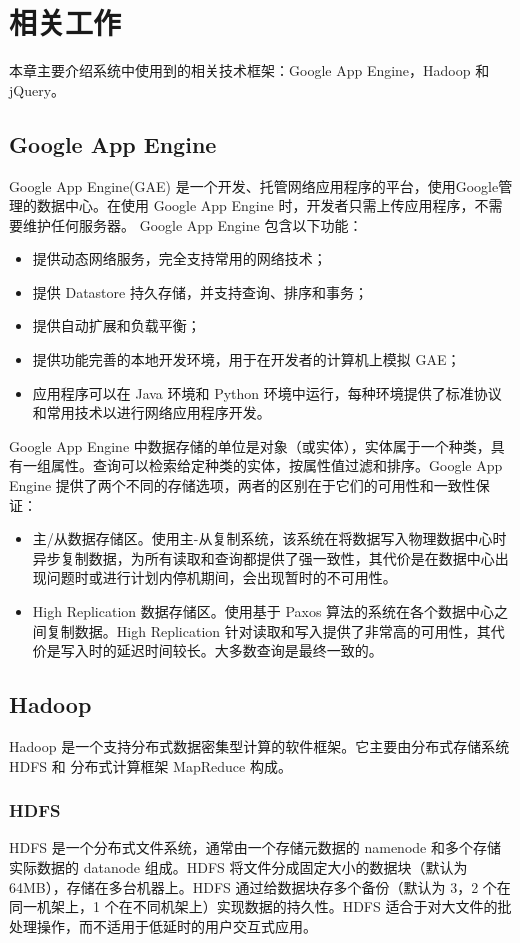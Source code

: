 \chapter{相关工作}
\thispagestyle{fancy}
本章主要介绍系统中使用到的相关技术框架：Google App Engine，Hadoop 和 jQuery。

\section{Google App Engine}
Google App Engine\cite{gae}(GAE) 是一个开发、托管网络应用程序的平台，使用Google管理的数据中心。在使用 Google App Engine 时，开发者只需上传应用程序，不需要维护任何服务器。
Google App Engine 包含以下功能：
\begin{itemize}
\item 提供动态网络服务，完全支持常用的网络技术；
\item 提供 Datastore 持久存储，并支持查询、排序和事务；
\item 提供自动扩展和负载平衡；
\item 提供功能完善的本地开发环境，用于在开发者的计算机上模拟 GAE；
\item 应用程序可以在 Java 环境和 Python 环境中运行，每种环境提供了标准协议和常用技术以进行网络应用程序开发。
\end{itemize}
Google App Engine 中数据存储的单位是对象（或实体），实体属于一个种类，具有一组属性。查询可以检索给定种类的实体，按属性值过滤和排序。Google App Engine 提供了两个不同的存储选项，两者的区别在于它们的可用性和一致性保证：
\begin{itemize}
\item 主/从数据存储区。使用主-从复制系统，该系统在将数据写入物理数据中心时异步复制数据，为所有读取和查询都提供了强一致性，其代价是在数据中心出现问题时或进行计划内停机期间，会出现暂时的不可用性。
\item High Replication 数据存储区。使用基于 Paxos 算法的系统在各个数据中心之间复制数据。High Replication 针对读取和写入提供了非常高的可用性，其代价是写入时的延迟时间较长。大多数查询是最终一致的。
\end{itemize}

\section{Hadoop}
Hadoop\cite{hadoop12} 是一个支持分布式数据密集型计算的软件框架。它主要由分布式存储系统 HDFS 和 分布式计算框架 MapReduce 构成。

\subsection{HDFS}
HDFS\cite{hdfs10} 是一个分布式文件系统，通常由一个存储元数据的 namenode 和多个存储实际数据的 datanode 组成。HDFS 将文件分成固定大小的数据块（默认为 64MB），存储在多台机器上。HDFS 通过给数据块存多个备份（默认为 3，2 个在同一机架上，1 个在不同机架上）实现数据的持久性。HDFS 适合于对大文件的批处理操作，而不适用于低延时的用户交互式应用。

